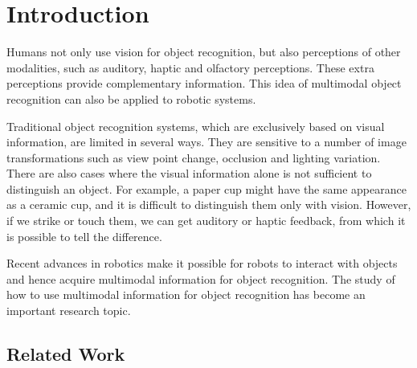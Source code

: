 \documentclass[12pt,final,twoside]{report}
\begin{document}

\cleardoublepage

\setcounter{tocdepth}{1}               %
\tableofcontents
\cleardoublepage
\listoffigures
\cleardoublepage
{}
\listoftables
\cleardoublepage

\fancyhead[LE]{\it \leftmark}           %
\fancyhead[RO]{\it \rightmark}          %
\fancyhead[LO,RE]{}                     %


\chapter{Introduction}
Humans not only use vision for object recognition, but also perceptions of other modalities, such as auditory, haptic and olfactory perceptions. These extra perceptions provide complementary information. This idea of multimodal object recognition can also be applied to robotic systems.

Traditional object recognition systems, which are exclusively based on visual information, are limited in several ways. They are sensitive to a number of image transformations such as view point change, occlusion and lighting variation. There are also cases where the visual information alone is not sufficient to distinguish an object. For example, a paper cup might have the same appearance as a ceramic cup, and it is difficult to distinguish them only with vision. However, if we strike or touch them, we can get auditory or haptic feedback, from which it is possible to tell the difference.

Recent advances in robotics make it possible for robots to interact with objects and hence acquire multimodal information for object recognition. The study of how to use multimodal information for object recognition has become an important research topic.

\section{Related Work}
\end{document}

